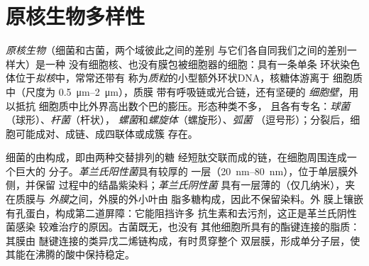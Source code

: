 \section{原核生物多样性}

\begin{definition}[原核细胞]\label{def:b2:unicellular-diversity:prokaryote}
\emph{原核生物}（细菌和古菌，两个域彼此之间的差别
与它们各自同我们之间的差别一样大）是一种
没有细胞核、也没有膜包被细胞器的细胞：具有一条单条
环状染色体位于\emph{拟核}中，常常还带有
称为\emph{质粒}的小型额外环状DNA，核糖体游离于
细胞质中（尺度为 \qtyrange{0.5}{2}{\micro m}），质膜
带有呼吸链或光合链，还有坚硬的
\emph{细胞壁}，用以抵抗
细胞质中比外界高出数个巴的膨压。形态种类不多，
且各有专名：\emph{球菌}（球形）、\emph{杆菌}（杆状），
\emph{螺菌}和\emph{螺旋体}（螺旋形）、\emph{弧菌}
（逗号形）；分裂后，细胞可能成对、成链、成四联体或成簇
存在。
\end{definition}

\begin{proposition}\label{prop:b2:unicellular-diversity:gram}
细菌的由\emph{}构成，即由两种交替排列的糖
经短肽交联而成的链，在细胞周围连成一个巨大的
分子。\emph{革兰氏阳性菌}具有较厚的
一层（\qtyrange{20}{80}{nm}），位于单层膜外侧，并保留
过程中的结晶紫染料；\emph{革兰氏阴性菌}
具有一层薄的（仅几纳米），夹在质膜与
\emph{外膜}之间，外膜的外小叶由
脂多糖构成，因此不保留染料。外
膜上镶嵌有孔蛋白，构成第二道屏障：它能阻挡许多
抗生素和去污剂，这正是革兰氏阴性菌感染
较难治疗的原因。古菌既无，也没有
其他细胞所具有的酯键连接的脂质：其膜由
醚键连接的类异戊二烯链构成，有时贯穿整个
双层膜，形成单分子层，使其能在沸腾的酸中保持稳定。
\end{proposition}

